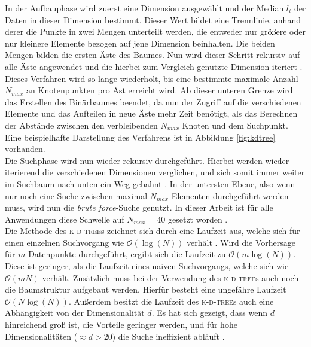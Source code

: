 In der Aufbauphase wird zuerst eine Dimension ausgewählt und der Median $l_i$ der Daten in dieser Dimension bestimmt. Dieser Wert bildet eine Trennlinie, anhand derer die Punkte in zwei Mengen unterteilt werden, die entweder nur größere oder nur kleinere Elemente bezogen auf jene Dimension beinhalten. Die beiden Mengen bilden die ersten Äste des Baumes. Nun wird dieser Schritt rekursiv auf alle Äste angewendet und die hierbei zum Vergleich genutzte Dimension iteriert \cite{de2000computational}. Dieses Verfahren wird so lange wiederholt, bis eine bestimmte maximale Anzahl $N_{max}$ an Knotenpunkten pro Ast erreicht wird. Ab dieser unteren Grenze wird das Erstellen des Binärbaumes beendet, da nun der Zugriff auf die verschiedenen Elemente und das Aufteilen in neue Äste mehr Zeit benötigt, als das Berechnen der Abstände zwischen den verbleibenden $N_{max}$ Knoten und dem Suchpunkt. Eine beispielhafte Darstellung des Verfahrens ist in Abbildung \ref{fig:kdtree} vorhanden.\\

Die Suchphase wird nun wieder rekursiv durchgeführt. Hierbei werden wieder iterierend die verschiedenen Dimensionen verglichen, und sich somit immer weiter im Suchbaum nach unten ein Weg gebahnt \cite{de2000computational}. In der untersten Ebene, also wenn nur noch eine Suche zwischen maximal $N_{max}$ Elementen durchgeführt werden muss, wird nun die \textit{brute force}-Suche genutzt. In dieser Arbeit ist für alle Anwendungen diese Schwelle auf $N_{max} = 40$ gesetzt worden \citep{scikitlearnneighbours}.\\

Die Methode des \textsc{k-d-tree}s zeichnet sich durch eine Laufzeit aus, welche sich für einen einzelnen Suchvorgang wie $\mathcal{O}(\log(N))$ verhält \cite{bentley1975multidimensional}. Wird die Vorhersage für $m$ Datenpunkte durchgeführt, ergibt sich die Laufzeit zu $\mathcal{O}(m\log(N))$. Diese ist geringer, als die Laufzeit eines naiven Suchvorgangs, welche sich wie $\mathcal{O}(mN)$ verhält. Zusätzlich muss bei der Verwendung des \textsc{k-d-tree}s auch noch die Baumstruktur aufgebaut werden. Hierfür besteht eine ungefähre Laufzeit $\mathcal{O}(N \log(N))$. Außerdem besitzt die Laufzeit des \textsc{k-d-tree}s auch eine Abhängigkeit von der Dimensionalität $d$. Es hat sich gezeigt, dass wenn $d$ hinreichend groß ist, die Vorteile geringer werden, und für hohe Dimensionalitäten ($\approx d > 20)$ die Suche ineffizient abläuft \citep{scikitlearnneighbours}.\\

